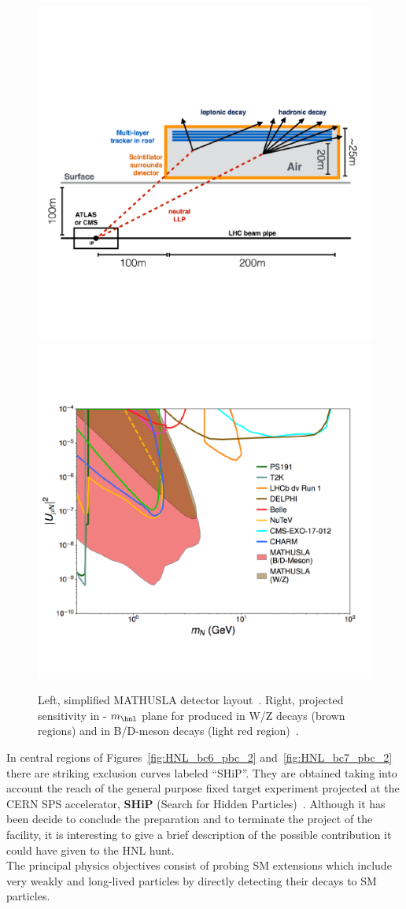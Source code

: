 \begin{figure}[h!]
\centering
    \includegraphics[clip,trim=0.3cm 0cm 1.cm 2cm, width=.45\textwidth]{Figures/c7/mathusla1.pdf}
    \includegraphics[clip,trim=0cm 2cm 0.5cm 3cm, width=.54\textwidth]{Figures/c7/mathusla2.pdf}
\caption{Left, simplified MATHUSLA detector
  layout~\cite{Alimena_2020}. Right, projected sensitivity in \mixparm
  - $m_\hnl$ plane for \hnl produced in W/Z decays (brown regions) and in B/D-meson decays (light red region)~\cite{Curtin_2019}.
}
\label{fig:mathu2}
\end{figure}


In central regions of Figures~\ref{fig:HNL_bc6_pbc_2}
and~\ref{fig:HNL_bc7_pbc_2} there are striking exclusion curves
labeled ``SHiP''. They are obtained taking into account the reach of
the general purpose fixed target experiment projected at the CERN SPS
accelerator, \textbf{SHiP} (Search for Hidden Particles)~\cite{bonivento2013proposal,
  shipcollaboration2015facility}. Although it has been decide to
conclude the preparation and to terminate the project of the facility,
it is interesting to give a brief description of the possible
contribution it could have given to the HNL hunt.\\
The principal physics objectives consist of probing SM extensions
which include very weakly and long-lived particles by directly
detecting their decays to SM particles.

